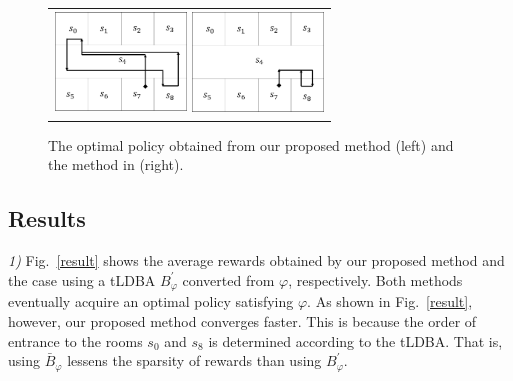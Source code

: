 \begin{figure}[tbp]
	\centering
	\begin{tabular}{c}

		\begin{minipage}{0.499\hsize}
		\centering
			\includegraphics[bb=0 0 341 256, height = 2.7cm,
			width=3.5cm]{proposed_policy.png}
		\end{minipage}

		\begin{minipage}{0.499\hsize}
			\centering
			\includegraphics[bb=0 0 341 257, height = 2.7cm,
			width=3.5cm]{Abate_policy.png}
		\end{minipage}
	\end{tabular}

	\caption{The optimal policy obtained from our proposed method (left) and the method in \cite{HAK2019, HKAKPL2019} (right).}
	\label{optimal}
\end{figure}

\subsection*{Results}
\textit{1) }
Fig.\ \ref{result} shows the average rewards obtained by our proposed method and the case using a tLDBA $B^{\prime}_{\varphi}$ converted from $\varphi$, respectively.
Both methods eventually acquire an optimal policy satisfying $\varphi$. As shown in Fig.\ \ref{result}, however, our proposed method converges faster. This is because the order of entrance to the rooms $s_0$ and $s_8$ is determined according to the tLDBA.
That is, using $\bar{B}_{\varphi}$ lessens the sparsity of rewards than using $B^{\prime}_{\varphi}$.

